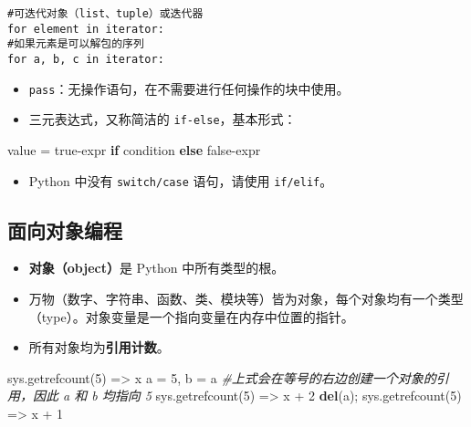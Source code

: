 \documentclass[]{ctexart}
\newenvironment{Shaded}{}{}
\newcommand{\KeywordTok}[1]{\textcolor[rgb]{0.00,0.44,0.13}{\textbf{{#1}}}}
\newcommand{\DecValTok}[1]{\textcolor[rgb]{0.25,0.63,0.44}{{#1}}}
\newcommand{\CommentTok}[1]{\textcolor[rgb]{0.38,0.63,0.69}{\textit{{#1}}}}
\newcommand{\ControlFlowTok}[1]{\textcolor[rgb]{0.00,0.44,0.13}{\textbf{{#1}}}}
\newcommand{\OperatorTok}[1]{\textcolor[rgb]{0.40,0.40,0.40}{{#1}}}
\newcommand{\NormalTok}[1]{{#1}}
\begin{document}
\begin{verbatim}
#可迭代对象（list、tuple）或迭代器
for element in iterator:
#如果元素是可以解包的序列
for a, b, c in iterator:
\end{verbatim}

\begin{itemize}
\item
  \texttt{pass}：无操作语句，在不需要进行任何操作的块中使用。
\item
  三元表达式，又称简洁的 \texttt{if-else}，基本形式：
\end{itemize}

\begin{Shaded}
\begin{Highlighting}[]
\NormalTok{value }\OperatorTok{=} \NormalTok{true}\OperatorTok{-}\NormalTok{expr }\ControlFlowTok{if} \NormalTok{condition }\ControlFlowTok{else} \NormalTok{false}\OperatorTok{-}\NormalTok{expr}
\end{Highlighting}
\end{Shaded}

\begin{itemize}
\item
  Python 中没有 \texttt{switch/case} 语句，请使用 \texttt{if/elif}。
\end{itemize}

\hypertarget{header-n327}{\subsection{面向对象编程}\label{header-n327}}

\begin{itemize}
\item
  \textbf{对象（object）}是 Python 中所有类型的根。
\item
  万物（数字、字符串、函数、类、模块等）皆为对象，每个对象均有一个类型（type）。对象变量是一个指向变量在内存中位置的指针。
\item
  所有对象均为\textbf{引用计数}。
\end{itemize}

\begin{Shaded}
\begin{Highlighting}[]
\NormalTok{sys.getrefcount(}\DecValTok{5}\NormalTok{) }\OperatorTok{=>} \NormalTok{x}
\NormalTok{a }\OperatorTok{=} \DecValTok{5}\NormalTok{, b }\OperatorTok{=} \NormalTok{a}
\CommentTok{#上式会在等号的右边创建一个对象的引用，因此 a 和 b 均指向 5}
\NormalTok{sys.getrefcount(}\DecValTok{5}\NormalTok{)}
\OperatorTok{=>} \NormalTok{x }\OperatorTok{+} \DecValTok{2}
\KeywordTok{del}\NormalTok{(a)}\OperatorTok{;} \NormalTok{sys.getrefcount(}\DecValTok{5}\NormalTok{) }\OperatorTok{=>} \NormalTok{x }\OperatorTok{+} \DecValTok{1}
\end{Highlighting}
\end{Shaded}
\end{document}
